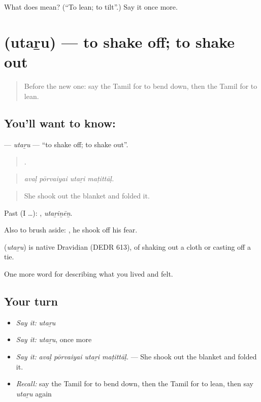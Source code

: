 \begin{tcolorbox}[breakable,colback=teal!4,colframe=teal!35!black,title={Before you move on}]
What does  mean? (\textquotedblleft{}To lean; to tilt\textquotedblright{}.) Say it once more.
\end{tcolorbox}
\section[\texorpdfstring{\ta{உதறு} (utaṟu)}{உதறு (utaṟu)}]{ (utaṟu) — to shake off; to shake out}

\label{lesson:TA-C490-utaru}



\begin{quote}
Before the new one: say the Tamil for to bend down, then the Tamil for to lean.
\end{quote}

\subsection*{You'll want to know: }
\textbf{} — \emph{utaṟu} — \textquotedblleft{}to shake off; to shake out\textquotedblright{}.

\begin{quote}
   .
\end{quote}

\begin{quote}
\emph{avaḷ pōrvaiyai utaṟi maṭittāḷ.}
\end{quote}

\begin{quote}
She shook out the blanket and folded it.
\end{quote}

Past (I …): , \emph{utaṟiṉēṉ}.

Also to brush aside:  , he shook off his fear.

\begin{cousinweb}
\textbf{} (\emph{utaṟu}) is native Dravidian (DEDR 613), of shaking out a cloth or casting off a tie.
\end{cousinweb}

\begin{grammarlens}[title={What you've built}]
One more word for describing what you lived and felt.
\end{grammarlens}

\subsection*{Your turn}
\begin{itemize}
\raggedright
  \item \emph{Say it:} \emph{utaṟu}
  \item \emph{Say it:} \emph{utaṟu}, once more
  \item \emph{Say it:} \emph{avaḷ pōrvaiyai utaṟi maṭittāḷ.} — She shook out the blanket and folded it.
  \item \emph{Recall:} say the Tamil for to bend down, then the Tamil for to lean, then say \emph{utaṟu} again
\end{itemize}

